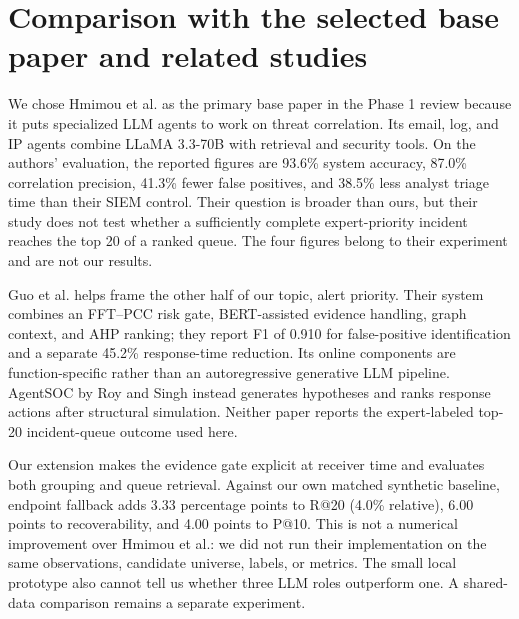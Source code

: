 \section{Comparison with the selected base paper and related studies}\label{sec:base}
We chose Hmimou et al. \cite{hmimou2025} as the primary base paper in the Phase 1 review because it puts specialized LLM agents to work on threat correlation. Its email, log, and IP agents combine LLaMA 3.3-70B with retrieval and security tools. On the authors' evaluation, the reported figures are 93.6\% system accuracy, 87.0\% correlation precision, 41.3\% fewer false positives, and 38.5\% less analyst triage time than their SIEM control. Their question is broader than ours, but their study does not test whether a sufficiently complete expert-priority incident reaches the top 20 of a ranked queue. The four figures belong to their experiment and are not our results.

Guo et al. \cite{guo2026} helps frame the other half of our topic, alert priority. Their system combines an FFT--PCC risk gate, BERT-assisted evidence handling, graph context, and AHP ranking; they report F1 of 0.910 for false-positive identification and a separate 45.2\% response-time reduction. Its online components are function-specific rather than an autoregressive generative LLM pipeline. AgentSOC by Roy and Singh \cite{agentsoc2026} instead generates hypotheses and ranks response actions after structural simulation. Neither paper reports the expert-labeled top-20 incident-queue outcome used here.

Our extension makes the evidence gate explicit at receiver time and evaluates both grouping and queue retrieval. Against our own matched synthetic baseline, endpoint fallback adds 3.33 percentage points to R@20 (4.0\% relative), 6.00 points to recoverability, and 4.00 points to P@10. This is not a numerical improvement over Hmimou et al.: we did not run their implementation on the same observations, candidate universe, labels, or metrics. The small local prototype also cannot tell us whether three LLM roles outperform one. A shared-data comparison remains a separate experiment.
